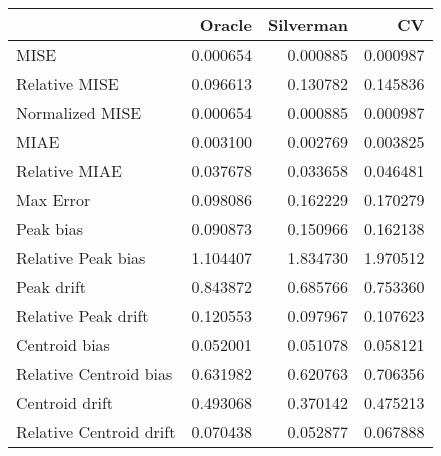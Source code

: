 \begin{tabular}{lrrr}
  \hline
 & Oracle & Silverman & CV \\ 
  \hline
MISE & 0.000654 & 0.000885 & 0.000987 \\ 
  Relative MISE & 0.096613 & 0.130782 & 0.145836 \\ 
  Normalized MISE & 0.000654 & 0.000885 & 0.000987 \\ 
  MIAE & 0.003100 & 0.002769 & 0.003825 \\ 
  Relative MIAE & 0.037678 & 0.033658 & 0.046481 \\ 
  Max Error & 0.098086 & 0.162229 & 0.170279 \\ 
  Peak bias & 0.090873 & 0.150966 & 0.162138 \\ 
  Relative Peak bias & 1.104407 & 1.834730 & 1.970512 \\ 
  Peak drift & 0.843872 & 0.685766 & 0.753360 \\ 
  Relative Peak drift & 0.120553 & 0.097967 & 0.107623 \\ 
  Centroid bias & 0.052001 & 0.051078 & 0.058121 \\ 
  Relative Centroid bias & 0.631982 & 0.620763 & 0.706356 \\ 
  Centroid drift & 0.493068 & 0.370142 & 0.475213 \\ 
  Relative Centroid drift & 0.070438 & 0.052877 & 0.067888 \\ 
   \hline
\end{tabular}
